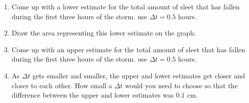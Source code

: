 \documentclass[12pt]{article}
\begin{document}
\begin{enumerate}
  \item Come up with a lower estimate for the total amount of sleet
    that has fallen during the first three hours of the storm. use
    $\Delta t = 0.5$ hours.
  \item Draw the area representing this lower estimate on the graph. 
  \item Come up with an upper estimate for the total amount of sleet
    that has fallen during the first three hours of the storm. use
    $\Delta t = 0.5$ hours.
  \item As $\Delta t$ gets smaller and smaller, the upper and lower
    estimates get closer and closer to each other. How small a $\Delta
    t$ would you need to choose so that the difference between the
    upper and lower estimates was $0.1$ cm.
\end{enumerate}
\end{document}
